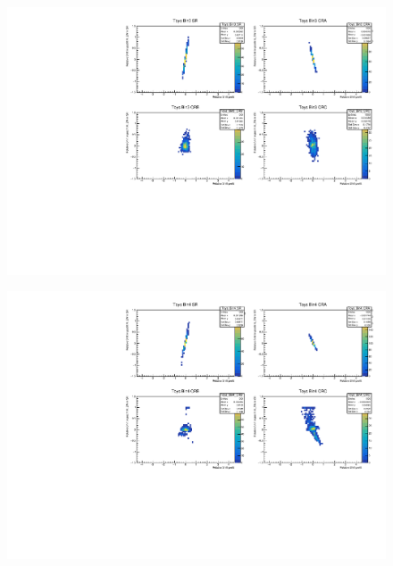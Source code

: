 \begin{figure}[H]
\includegraphics[width=\textwidth]{plots/diffx/instab/linearfx/instabilities_mjj_QCD_Mgraph_Signal_Sh2211_BSDATASTATS_linearfx_newbinning_madgraphasimov_bin3.pdf}
\end{figure}
\begin{figure}[H]
\includegraphics[width=\textwidth]{plots/diffx/instab/linearfx/instabilities_mjj_QCD_Mgraph_Signal_Sh2211_BSDATASTATS_linearfx_newbinning_madgraphasimov_bin4.pdf}
\end{figure}

